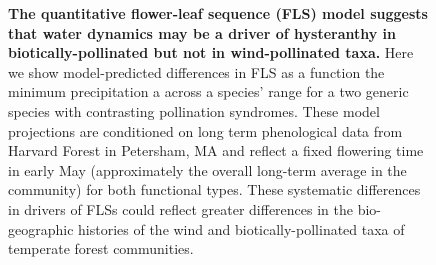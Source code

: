 \documentclass[11pt]{article}
\begin{document}
\begin{figure}[h!] 
\centering
\caption{\textbf{The quantitative flower-leaf sequence (FLS) model suggests that water dynamics may be a driver of hysteranthy in biotically-pollinated but not in wind-pollinated taxa.} Here we show model-predicted differences in FLS as a function the minimum precipitation a across a species' range for a two generic species with contrasting pollination syndromes. These model projections are conditioned on long term phenological data from Harvard Forest in Petersham, MA \citep{OKeefe2015} and reflect a fixed flowering time in early May (approximately the overall long-term average in the community) for both functional types. These systematic differences in drivers of FLSs could reflect greater differences in the bio-geographic histories of the wind and biotically-pollinated taxa of temperate forest communities.}
        \label{fig:apcs}
    \end{figure}


    
\end{document}
